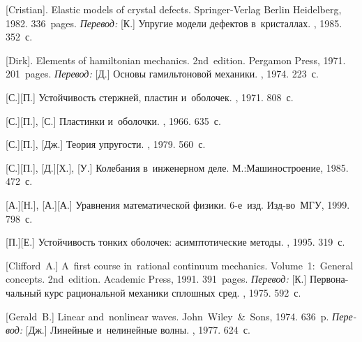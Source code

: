 \begin{thebibliography}{123}
\begin{otherlanguage}{russian}
[Cristian]. Elastic models of crystal defects. Springer\hbox{-}Verlag Berlin Heidelberg, 1982. 336~pages.
\emph{Перевод:} [К.] Упругие модели дефектов в~кристаллах. \mirpublisher, 1985. 352~с.

[Dirk]. Elements of hamiltonian mechanics. 2nd~edition. Pergamon Press, 1971. 201~pages.
\emph{Перевод:} [Д.] Основы гамильтоновой механики. \naukapublisher, 1974. 223~с.

[С.][П.] Устойчивость стержней, пластин и~оболочек. \naukapublisher, 1971. 808~с.

[С.][П.], [С.] Пластинки и~оболочки. \naukapublisher, 1966. 635~с.

[С.][П.], [Дж.] Теория упругости. \naukapublisher, 1979. 560~с.

[С.][П.], [Д.][Х.], [У.] Колебания в~инженерном деле. М.:\;Машино\-строение, 1985. 472~с.

[А.][Н.], [А.][А.] Уравнения математической физики. 6\hbox{-}е~изд. Изд\hbox{-}во~МГУ, 1999. 798~с.

[П.][Е.] Устойчивость тонких оболочек: асимптотические методы. \naukapublisher, 1995. 319~с.

[Clifford~A.] A~first course in~rational continuum mechanics. Volume~1:~General concepts. 2nd~edition. Academic Press, 1991. 391~pages. %
\emph{Перевод:} [К.] Первоначальный курс рациональной механики сплошных сред. \mirpublisher, 1975. 592~с.

[Gerald~B.] Linear and~nonlinear waves. John~Wiley~\&~Sons, 1974. 636~p.
\emph{Перевод:} [Дж.] Линейные и~нелинейные волны. \mirpublisher, 1977. 624~с.


\end{otherlanguage}
\end{thebibliography}

